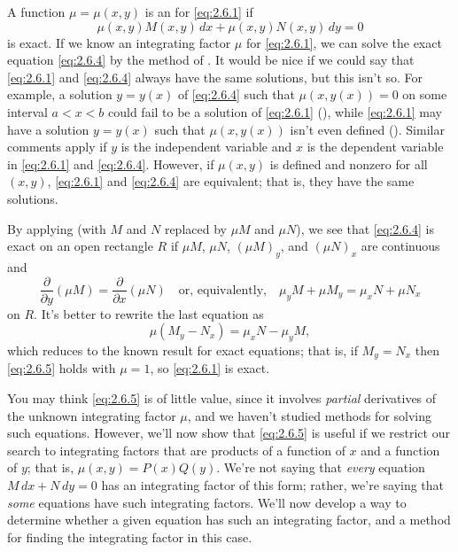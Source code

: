 A function $\mu=\mu(x,y)$ is  an  for
\eqref{eq:2.6.1}  if
\begin{equation}\label{eq:2.6.4}
 \mu(x,y)M (x,y)\,dx+\mu(x,y)N (x,y)\,dy=0
 \end{equation}
 is exact. If we know an integrating
factor $\mu$ for \eqref{eq:2.6.1}, we can solve the exact equation
\eqref{eq:2.6.4} by the method of . It would be
nice
if we could say that \eqref{eq:2.6.1} and \eqref{eq:2.6.4} always have the
same solutions, but this isn't so. For example, a solution
$y=y(x)$ of \eqref{eq:2.6.4} such that $\mu(x,y(x))=0$ on some interval
$a<x<b$ could fail to be a solution of \eqref{eq:2.6.1}
(), while
\eqref{eq:2.6.1} may have a solution $y=y(x)$ such that $\mu(x,y(x)) $
isn't even defined (). Similar comments
apply if $y$ is the independent variable and $x$ is the dependent
variable  in \eqref{eq:2.6.1} and \eqref{eq:2.6.4}.  However, if $\mu(x,y)$
is defined and nonzero for all $(x,y)$,  \eqref{eq:2.6.1}  and
\eqref{eq:2.6.4} are equivalent; that is, they have the same solutions.


By applying  (with $M$ and $N$ replaced by $\mu M$
and $\mu N$), we see that \eqref{eq:2.6.4} is exact on an open rectangle
$R$ if $\mu M$, $\mu N$, $(\mu M)_y$, and $(\mu N)_x$ are continuous
and
\[
\frac{\partial}{\partial y}(\mu M)=\frac{\partial}{\partial x}
(\mu N) \quad\text{or, equivalently,}\quad
\mu_yM+\mu M_y=\mu_xN+\mu N_x
\]
on $R$. It's better to rewrite the last equation as
\begin{equation} \label{eq:2.6.5}
\mu(M_y-N_x)=\mu_xN-\mu_yM,
\end{equation}
which  reduces to  the known result for exact equations;
that is, if $M_y=N_x$ then \eqref{eq:2.6.5} holds with $\mu=1$, so
\eqref{eq:2.6.1} is exact.

You may think  \eqref{eq:2.6.5} is of little value, since it involves
\emph{\color{blue}partial} derivatives of the unknown integrating factor $\mu$,
and we haven't studied methods for solving such equations. However,
we'll now show that \eqref{eq:2.6.5} is useful if we restrict our search
to integrating factors that are products of a function of
$x$ and a function of $y$; that is,
$\mu(x,y)=P(x)Q(y)$.
We're not saying that \emph{\color{blue}every} equation
 $M\,dx+N\,dy=0$ has an integrating factor of this
form;   rather, we're saying that \emph{\color{blue}some} equations have
such integrating
factors. We'll now develop a way to determine whether a given
equation has such an integrating factor, and a method for finding the
integrating factor in this case.


